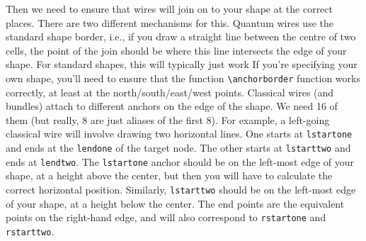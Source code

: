 \documentclass[aps,pra,10pt,nofootinbib]{revtex4-2}
\begin{document}
Then we need to ensure that wires will join on to your shape at the correct places. There are two different mechanisms for this. Quantum wires use the standard shape border, i.e., if you draw a straight line between the centre of two cells, the point of the join should be where this line intersects the edge of your shape. For standard shapes, this will typically just work If you're specifying your own shape, you'll need to ensure that the function \verb!\anchorborder! function works correctly, at least at the north/south/east/west points. Classical wires (and bundles) attach to different anchors on the edge of the shape. We need 16 of them (but really, 8 are just aliases of the first 8). For example, a left-going classical wire will involve drawing two horizontal lines. One starts at \texttt{lstartone} and ends at the \texttt{lendone} of the target node. The other starts at \texttt{lstarttwo} and ends at \texttt{lendtwo}. The \texttt{lstartone} anchor should be on the left-most edge of your shape, at a height  above the center, but then you will have to calculate the correct horizontal position. Similarly, \texttt{lstarttwo} should be on the left-most edge of your shape, at a height  below the center. The end points are the equivalent points on the right-hand edge, and will also correspond to \texttt{rstartone} and \texttt{rstarttwo}.
\end{document}
